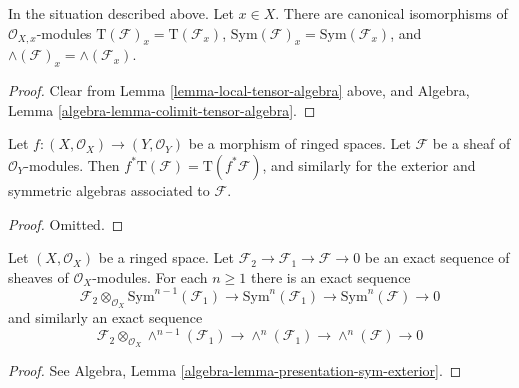 \begin{lemma}
\label{lemma-stalk-tensor-algebra}
In the situation described above. Let $x \in X$.
There are canonical isomorphisms of $\mathcal{O}_{X, x}$-modules
$\text{T}(\mathcal{F})_x = \text{T}(\mathcal{F}_x)$,
$\text{Sym}(\mathcal{F})_x = \text{Sym}(\mathcal{F}_x)$, and
$\wedge(\mathcal{F})_x = \wedge(\mathcal{F}_x)$.
\end{lemma}

\begin{proof}
Clear from Lemma \ref{lemma-local-tensor-algebra} above, and
Algebra, Lemma \ref{algebra-lemma-colimit-tensor-algebra}.
\end{proof}

\begin{lemma}
\label{lemma-pullback-tensor-algebra}
Let $f : (X, \mathcal{O}_X) \to (Y, \mathcal{O}_Y)$ be a morphism of
ringed spaces. Let $\mathcal{F}$ be a sheaf of $\mathcal{O}_Y$-modules.
Then $f^*\text{T}(\mathcal{F}) = \text{T}(f^*\mathcal{F})$,
and similarly for the exterior and symmetric algebras associated
to $\mathcal{F}$.
\end{lemma}

\begin{proof}
Omitted.
\end{proof}

\begin{lemma}
\label{lemma-presentation-sym-exterior}
Let $(X, \mathcal{O}_X)$ be a ringed space.
Let $\mathcal{F}_2 \to \mathcal{F}_1 \to \mathcal{F} \to 0$
be an exact sequence of sheaves of $\mathcal{O}_X$-modules.
For each $n \geq 1$ there is an exact sequence
$$
\mathcal{F}_2 \otimes_{\mathcal{O}_X} \text{Sym}^{n - 1}(\mathcal{F}_1)
\to
\text{Sym}^n(\mathcal{F}_1)
\to
\text{Sym}^n(\mathcal{F})
\to
0
$$
and similarly an exact sequence
$$
\mathcal{F}_2 \otimes_{\mathcal{O}_X} \wedge^{n - 1}(\mathcal{F}_1)
\to
\wedge^n(\mathcal{F}_1)
\to
\wedge^n(\mathcal{F})
\to
0
$$
\end{lemma}

\begin{proof}
See Algebra, Lemma \ref{algebra-lemma-presentation-sym-exterior}.
\end{proof}

